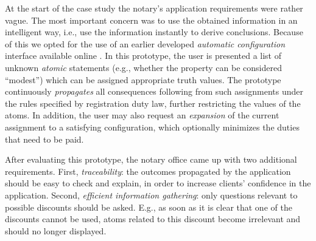 At the start of the case study the notary's application requirements were rather vague.
The most important concern was to use the obtained information in an intelligent way, i.e., use the information instantly to derive conclusions.
Because of this we opted for the use of an earlier developed \textit{automatic configuration} interface available online \cite{idphome}.
In this prototype, the user is presented a list of unknown \emph{atomic} statements (e.g., whether the property can be considered ``modest'') which can be assigned appropriate truth values.
The prototype continuously \emph{propagates} all consequences following from such assignments under the rules specified by registration duty law, further restricting the values of the atoms.
In addition, the user may also request an \emph{expansion} of the current assignment to a satisfying configuration, which optionally minimizes the duties that need to be paid.

After evaluating this prototype, the notary office came up with two additional requirements.
First, \emph{traceability}: the outcomes propagated by the application should be easy to check and explain,  in order to increase clients' confidence in the application.  
Second, \emph{efficient information gathering}: only questions relevant to possible discounts should be asked. E.g., as soon as it is clear that one of the discounts cannot be used, atoms related to this discount become irrelevant and should no longer displayed.

